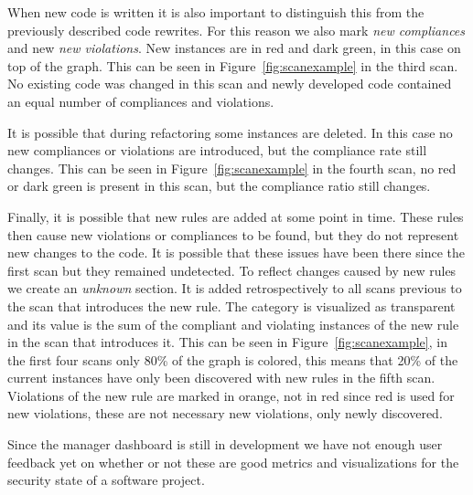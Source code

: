 
When new code is written it is also important to distinguish this from the previously described code rewrites. For this reason we also mark \emph{new compliances} and new \emph{new violations}. New instances are in red and dark green, in this case on top of the graph. This can be seen in Figure~\ref{fig:scanexample} in the third scan. No existing code was changed in this scan and newly developed code contained an equal number of compliances and violations.

It is possible that during refactoring some instances are deleted. In this case no new compliances or violations are introduced, but the compliance rate still changes. This can be seen in Figure~\ref{fig:scanexample} in the fourth scan, no red or dark green is present in this scan, but the compliance ratio still changes.

Finally, it is possible that new rules are added at some point in time. These rules then cause new violations or compliances to be found, but they do not represent new changes to the code. It is possible that these issues have been there since the first scan but they remained undetected. To reflect changes caused by new rules we create an \emph{unknown} section. It is added retrospectively to all scans previous to the scan that introduces the new rule. The category is visualized as transparent and its value is the sum of the compliant and violating instances of the new rule in the scan that introduces it. This can be seen in Figure~\ref{fig:scanexample}, in the first four scans only 80\% of the graph is colored, this means that 20\% of the current instances have only been discovered with new rules in the fifth scan. Violations of the new rule are marked in orange, not in red since red is used for new violations, these are not necessary new violations, only newly discovered.

Since the manager dashboard is still in development we have not enough user feedback yet on whether or not these are good metrics and visualizations for the security state of a software project.

